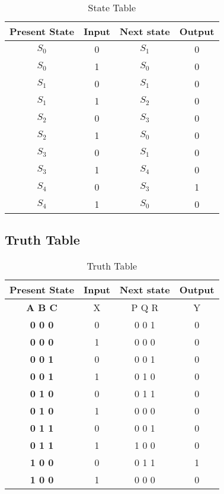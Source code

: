 \documentclass{article}
\begin{document}
  \vspace{5mm}
  \begin{table}[H]
  \centering
  \begin{tabular}{|c|c|c|c|}
  \hline
   
   \textbf{Present State}&{Input}&{Next state}&{Output}\\
   \hline
   
	 \textbf{$S_0$}&{0}&{$S_1$}&{0}\\
         \textbf{$S_0$}&{1}&{$S_0$}&{0}\\
         \textbf{$S_1$}&{0}&{$S_1$}&{0}\\
         \textbf{$S_1$}&{1}&{$S_2$}&{0}\\
         \textbf{$S_2$}&{0}&{$S_3$}&{0}\\
         \textbf{$S_2$}&{1}&{$S_0$}&{0}\\
         \textbf{$S_3$}&{0}&{$S_1$}&{0}\\
         \textbf{$S_3$}&{1}&{$S_4$}&{0}\\
         \textbf{$S_4$}&{0}&{$S_3$}&{1}\\
         \textbf{$S_4$}&{1}&{$S_0$}&{0}\\
  \hline
  \end{tabular}
  \vspace{5mm}
  \caption{State Table}  
  \end{table}

\subsection{Truth Table}
  
  \vspace{5mm}
  \begin{table}[H]
  \centering
  \begin{tabular}{|c|c|c|c|}
  \hline
   
   \textbf{Present State}&{Input}&{Next state}&{Output}\\
   \hline
   \textbf{A B C}&{X}&{P Q R}&{Y}\\
   \hline	  
   \textbf{0 0 0}&{0}&{0 0 1}&{0}\\
   \textbf{0 0 0}&{1}&{0 0 0}&{0}\\
   \textbf{0 0 1}&{0}&{0 0 1}&{0}\\
   \textbf{0 0 1}&{1}&{0 1 0}&{0}\\
   \textbf{0 1 0}&{0}&{0 1 1}&{0}\\
   \textbf{0 1 0}&{1}&{0 0 0}&{0}\\
   \textbf{0 1 1}&{0}&{0 0 1}&{0}\\
   \textbf{0 1 1}&{1}&{1 0 0}&{0}\\
   \textbf{1 0 0}&{0}&{0 1 1}&{1}\\
   \textbf{1 0 0}&{1}&{0 0 0}&{0}\\
  \hline
  \end{tabular}
  \vspace{5mm}
  \caption{Truth Table}
  \label{Table:2}
  \end{table}
\end{document}
